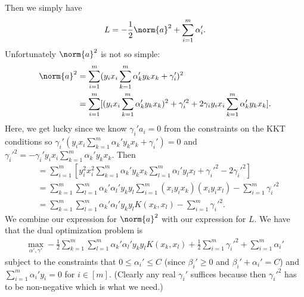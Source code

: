 \begin{enumerate}
\begin{enumerate}
        Then we simply have
        \begin{align}
            L=-\frac{1}{2}\norm{a}^2 + \sum_{i=1}^m \alpha_i'.
            \nonumber
        \end{align}
        Unfortunately $\norm{a}^2$ is not so simple:
        \begin{align}
            \norm{a}^2 &= \sum_{i=1}^m(y_i x_i
            \sum_{k=1}^m \alpha_k' y_k x_k +\gamma_i')^2
            \nonumber \\
            &= \sum_{i=1}^m [(y_i x_i \sum_{k=1}^m \alpha_k' y_k x_k)^2
            + \gamma_i'^2 + 2\gamma_i y_i x_i \sum_{k=1}^m \alpha_k' y_k x_k].
            \nonumber
        \end{align}
        Here, we get lucky since we know $\gamma_i'a_i = 0$
        from the constraints on the KKT conditions so
        $\gamma_i'(y_i x_i \sum_{k=1}^m \alpha_k' y_k x_k +\gamma_i')=0$
        and
        $\gamma_i'^2 = -\gamma_i'y_i x_i \sum_{k=1}^m \alpha_k' y_k x_k$.
        Then 
        \begin{align}
            &= \sum_{i=1}^m[y_i^2 x_i^2 \sum_{k=1}^m\alpha_k'y_k x_k
            \sum_{l=1}^m\alpha_l'y_l x_l + \gamma_i'^2 - 2\gamma_i'^2]
            \nonumber \\
            &= \sum_{k=1}^m\sum_{l=1}^m \alpha_k'\alpha_l' y_k y_l
            \sum_{i=1}^m(x_i y_i x_k) (x_i y_i x_l)
            - \sum_{i=1}^m \gamma_i'^2 \nonumber \\
            &= \sum_{k=1}^m\sum_{l=1}^m \alpha_k'\alpha_l' y_k y_l K(x_k,x_l)
            - \sum_{i=1}^m \gamma_i'^2 \nonumber.
        \end{align}
        We combine our expression for $\norm{a}^2$ with 
        our expression for $L$.
        We have that the dual optimization problem is
        \begin{align}
            \max_{\alpha', \gamma'}
            -\frac{1}{2} \sum_{k=1}^m\sum_{l=1}^m \alpha_k'\alpha_l' y_k y_l K(x_k,x_l)
            + \frac{1}{2} \sum_{i=1}^m \gamma_i'^2
            + \sum_{i=1}^m\alpha_i'
            \nonumber
        \end{align}
        subject to the constraints that $0 \leq \alpha_i' \leq C$
        (since $\beta_i'\geq0$ and $\beta_i'+\alpha_i'=C$) and
        $\sum_{i=1}^m\alpha_i'y_i=0$ for $i \in [m]$.
        (Clearly any real $\gamma_i'$ suffices because then
        $\gamma_i'^2$ has to be non-negative which is what we need.)


\end{enumerate}
\end{enumerate}
